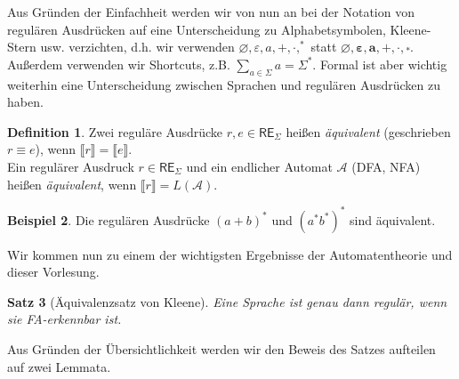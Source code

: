 \documentclass[11pt, a4paper]{article}
\theoremstyle{definition}
\newtheorem{definition}{Definition}[section]
\newtheorem{example}[definition]{Beispiel}
\theoremstyle{plain}
\newtheorem{theorem}[definition]{Satz}
\numberwithin{equation}{section}
\let\emptyset\varnothing
\begin{document}
Aus Gründen der Einfachheit werden wir von nun an bei der Notation von regulären Ausdrücken auf eine Unterscheidung zu Alphabetsymbolen, Kleene-Stern usw. verzichten, d.h. wir verwenden $\emptyset, \varepsilon, a, +, \cdot, ^\ast$ statt $\bm{\emptyset}, \bm{\varepsilon}, \bm{a}, \bm{+}, \bm{\cdot}, \overset{\bm{\ast}}{}$. Außerdem verwenden wir Shortcuts, z.B. $\sum_{a\in\Sigma} a = \Sigma^\ast$. Formal ist aber wichtig weiterhin eine Unterscheidung zwischen Sprachen und regulären Ausdrücken zu haben.
\begin{definition}
	Zwei reguläre Ausdrücke $r, e \in \mathsf{RE}_\Sigma$ heißen \textit{äquivalent} (geschrieben $r \equiv e$), wenn $\llbracket r \rrbracket = \llbracket e \rrbracket$.\\
	Ein regulärer Ausdruck $r \in \mathsf{RE}_\Sigma$ und ein endlicher Automat $\mathcal{A}$ (DFA, NFA) heißen \textit{äquivalent}, wenn  $\llbracket r \rrbracket = L(\mathcal{A})$.
\end{definition}
\begin{example}
	Die regulären Ausdrücke $(a + b)^\ast$ und $(a^\ast b^\ast)^\ast$ sind äquivalent.
\end{example}
Wir kommen nun zu einem der wichtigsten Ergebnisse der Automatentheorie und dieser Vorlesung.
\begin{theorem}[Äquivalenzsatz von Kleene]\label{thm:kleene_equivalence}
	Eine Sprache ist genau dann regulär, wenn sie FA-erkennbar ist.
\end{theorem}
Aus Gründen der Übersichtlichkeit werden wir den Beweis des Satzes aufteilen auf zwei Lemmata.
\end{document}
